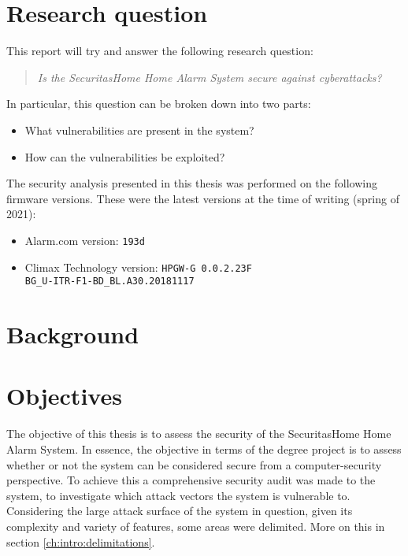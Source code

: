 \section{Research question} \label{ch:intro:research-question}
This report will try and answer the following research question:

\begin{quote}
    \textit{Is the SecuritasHome Home Alarm System secure against cyberattacks?}
\end{quote}

In particular, this question can be broken down into two parts:

\begin{itemize}
    \item What vulnerabilities are present in the system?
    \item How can the vulnerabilities be exploited?
\end{itemize}

The security analysis presented in this thesis was performed on the following firmware versions. These were the latest versions at the time of writing (spring of 2021):
\begin{itemize}
    \item Alarm.com version: \texttt{193d}
    \item Climax Technology version: \texttt{HPGW-G 0.0.2.23F\\ BG\_U-ITR-F1-BD\_BL.A30.20181117}
\end{itemize}

\section{Background} \label{ch:intro:background}
\todo

\section{Objectives} \label{ch:intro:objectives}
The objective of this thesis is to assess the security of the SecuritasHome Home Alarm System. In essence, the objective in terms of the degree project is to assess whether or not the system can be considered secure from a computer-security perspective. To achieve this a comprehensive security audit was made to the system, to investigate which attack vectors the system is vulnerable to. Considering the large attack surface of the system in question, given its complexity and variety of features, some areas were delimited. More on this in section \ref{ch:intro:delimitations}.

